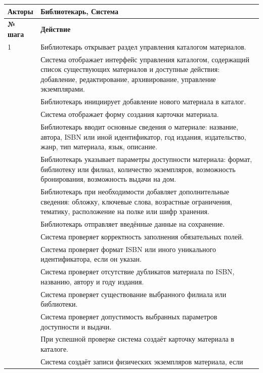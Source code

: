 \documentclass[12pt,a4paper]{article}
\begin{document}
\begin{xltabular}{\textwidth}{
				|>{\raggedright\arraybackslash}p{2.7cm}
				|>{\raggedright\arraybackslash}X|
			}
			\textbf{Акторы} &
			Библиотекарь, Система \\
			\hline
			
			
			\textbf{№ шага} & \textbf{Действие} \\
			\hline
			
			1 & Библиотекарь открывает раздел управления каталогом материалов. \\
			 & Система отображает интерфейс управления каталогом, содержащий список
			существующих материалов и доступные действия: добавление,
			редактирование, архивирование, управление экземплярами. \\
			 & Библиотекарь инициирует добавление нового материала в каталог. \\
			 & Система отображает форму создания карточки материала. \\
			 & Библиотекарь вводит основные сведения о материале: название, автора,
			ISBN или иной идентификатор, год издания, издательство, жанр, тип
			материала, язык, описание. \\
			 & Библиотекарь указывает параметры доступности материала: формат,
			библиотеку или филиал, количество экземпляров, возможность
			бронирования, возможность выдачи на дом. \\
			 & Библиотекарь при необходимости добавляет дополнительные сведения:
			обложку, ключевые слова, возрастные ограничения, тематику, расположение
			на полке или шифр хранения. \\
			 & Библиотекарь отправляет введённые данные на сохранение. \\
			 & Система проверяет корректность заполнения обязательных полей. \\
			 & Система проверяет формат ISBN или иного уникального идентификатора,
			если он указан. \\
			 & Система проверяет отсутствие дубликатов материала по ISBN, названию,
			автору и году издания. \\
			 & Система проверяет существование выбранного филиала или библиотеки. \\
			 & Система проверяет допустимость выбранных параметров доступности и
			выдачи. \\
			 & При успешной проверке система создаёт карточку материала в каталоге. \\
			 & Система создаёт записи физических экземпляров материала, если

\end{xltabular}
\end{document}
